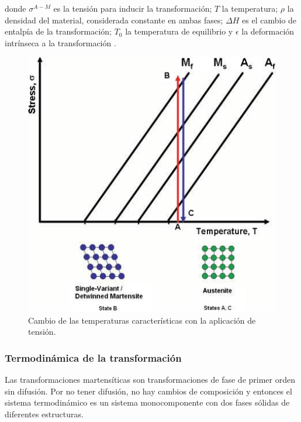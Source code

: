 \documentclass[12pt]{article}
\theoremstyle{definition}
\theoremstyle{remark}
\begin{document}
donde $\sigma^{A-M}$ es la tensión para inducir la transformación; $T$ la temperatura; $\rho$ la densidad del material, considerada constante en ambas fases; $\Delta H$ es el cambio de entalpía de la transformación; $T_0$ la temperatura de equilibrio y $\epsilon$ la deformación intrínseca a la transformación \cite{Malvasio}.

\begin{figure}[H]
	\centering
	\includegraphics[scale=0.4]{img/StressTransformation.png}
	\caption{Cambio de las temperaturas características con la aplicación de tensión.}
	\label{TvsS}
\end{figure}

\subsubsection{Termodinámica de la transformación}
Las transformaciones martensíticas son transformaciones de fase de primer orden sin difusión. Por no tener difusión, no hay cambios de composición y entonces el sistema termodinámico es un sistema monocomponente con dos fases sólidas de diferentes estructuras.\cite{Santamarta}
\end{document}
